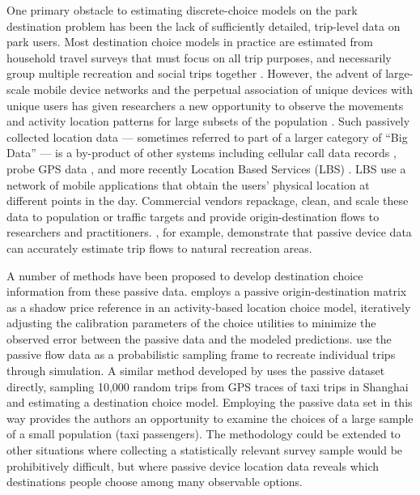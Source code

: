 \documentclass[3p, authoryear, review]{elsarticle} %
\begin{document}
One primary obstacle to estimating discrete-choice models on the park destination problem has been the lack of sufficiently detailed, trip-level data on park users. Most destination choice models in practice are estimated from household travel surveys that must focus on all trip purposes, and necessarily group multiple recreation and social trips together \citep{nchrp716}. However, the advent of large-scale mobile device networks and the perpetual association of unique devices with unique users has given researchers a new opportunity to observe the movements and activity location patterns for large subsets of the population \citep{Naboulsi2016}. Such passively collected location data --- sometimes referred to part of a larger category of ``Big Data'' --- is a by-product of other systems including cellular call data records \citep[e.g.,][]{Bolla2000, Calabrese2011}, probe GPS data \citep{Huang2015}, and more recently Location Based Services (LBS) \citep{Roll2019, Komanduri2017}. LBS use a network of mobile applications that obtain the users' physical location at different points in the day. Commercial vendors repackage, clean, and scale these data to population or traffic targets and provide origin-destination flows to researchers and practitioners. \citet{Monz2019}, for example, demonstrate that passive device data can accurately estimate trip flows to natural recreation areas.

A number of methods have been proposed to develop destination choice information from these passive data. \citet{Bernardin2018} employs a passive origin-destination matrix as a shadow price reference in an activity-based location choice model, iteratively adjusting the calibration parameters of the choice utilities to minimize the observed error between the passive data and the modeled predictions. \citet{tf_idea} use the passive flow data as a probabilistic sampling frame to recreate individual trips through simulation. A similar method developed by \citet{Zhu2018} uses the passive dataset directly, sampling 10,000 random trips from GPS traces of taxi trips in Shanghai and estimating a destination choice model. Employing the passive data set in this way provides the authors an opportunity to examine the choices of a large sample of a small population (taxi passengers). The \citet{Zhu2018} methodology could be extended to other situations where collecting a statistically relevant survey sample would be prohibitively difficult, but where passive device location data reveals which destinations people choose among many observable options.
\end{document}
